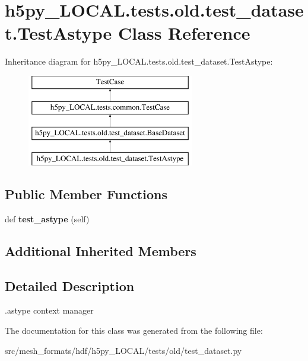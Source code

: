 \hypertarget{classh5py__LOCAL_1_1tests_1_1old_1_1test__dataset_1_1TestAstype}{}\section{h5py\+\_\+\+L\+O\+C\+A\+L.\+tests.\+old.\+test\+\_\+dataset.\+Test\+Astype Class Reference}
\label{classh5py__LOCAL_1_1tests_1_1old_1_1test__dataset_1_1TestAstype}
Inheritance diagram for h5py\+\_\+\+L\+O\+C\+A\+L.\+tests.\+old.\+test\+\_\+dataset.\+Test\+Astype\+:\begin{figure}[H]
\begin{center}
\leavevmode
\includegraphics[height=4.000000cm]{classh5py__LOCAL_1_1tests_1_1old_1_1test__dataset_1_1TestAstype}
\end{center}
\end{figure}
\subsection*{Public Member Functions}
\begin{DoxyCompactItemize}
\item 
\mbox{\label{classh5py__LOCAL_1_1tests_1_1old_1_1test__dataset_1_1TestAstype_aa3684614a78e5fcd33b348f6fc25e927}} 
def {\bfseries test\+\_\+astype} (self)
\end{DoxyCompactItemize}
\subsection*{Additional Inherited Members}


\subsection{Detailed Description}
\begin{DoxyVerb}    .astype context manager
\end{DoxyVerb}
 

The documentation for this class was generated from the following file\+:\begin{DoxyCompactItemize}
\item 
src/mesh\+\_\+formats/hdf/h5py\+\_\+\+L\+O\+C\+A\+L/tests/old/test\+\_\+dataset.\+py\end{DoxyCompactItemize}
